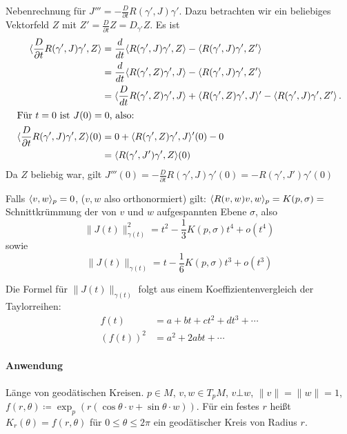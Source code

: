 \documentclass[a4paper,twoside,DIV15,BCOR12mm]{scrbook}
\renewcommand{\da}{\coloneqq}
\begin{document}
\begin{beispiel}
\begin{beweis}
\begin{enumerate}
Nebenrechnung für $J'''= -\frac D {\partial t} R(\gamma',J)\gamma'$. Dazu betrachten wir ein beliebiges Vektorfeld $Z$ mit $Z' = \frac D{\partial t}Z = D_{\gamma'}Z$. Es ist 
\begin{align*}
\langle\frac D{\partial t} R(\gamma',J) \gamma',Z\rangle &= \frac d{dt} \langle R(\gamma',J)\gamma',Z\rangle - \langle R(\gamma',J)\gamma',Z'\rangle\\
&= \frac d{dt} \langle R(\gamma',Z)\gamma',J\rangle - \langle R(\gamma',J)\gamma',Z'\rangle\\
&= \langle\frac D{dt} R(\gamma',Z)\gamma',J\rangle + \langle R(\gamma',Z)\gamma',J\rangle' - \langle R(\gamma',J)\gamma',Z'\rangle\,.\\
\intertext{Für $t=0$ ist $J(0)=0$, also:}
\langle\frac D{\partial t} R(\gamma',J) \gamma',Z\rangle(0) &= 0 + \langle R(\gamma',Z)\gamma',J\rangle'(0) - 0 \\
&= \langle R(\gamma',J')\gamma',Z\rangle(0)
\end{align*}
Da $Z$ beliebig war, gilt $J'''(0) = - \frac D{\partial t} R(\gamma',J) \gamma'(0) = - R(\gamma',J')\gamma'(0)$

\end{enumerate}
\end{beweis}

\begin{korrolar}
Falls $\langle v,w\rangle_p =0$, ($v,w$ also orthonormiert) gilt: $\langle R(v,w)v,w\rangle_p = K(p,\sigma) =$ Schnittkrümmung der von $v$ und $w$ aufgespannten Ebene $\sigma$, also
\[
\|J(t)\|_{\gamma(t)}^2 =t^2 - \frac 1 3 K(p,\sigma)t^4 + o(t^4)
\]
sowie
\[
\|J(t)\|_{\gamma(t)} = t - \frac 1 6 K(p,\sigma)t^3 + o(t^3)
\]

\end{korrolar}

\begin{beweis}
Die Formel für $\|J(t)\|_{\gamma(t)}$ folgt aus einem Koeffizientenvergleich der Taylorreihen:
\begin{align*}
f(t) &= a + bt + ct^2 + dt^3+\cdots \\
(f(t))^2 &= a^2 + 2abt + \cdots
\end{align*}
\end{beweis}

\paragraph{Anwendung} Länge von geodätischen Kreisen. $p\in M$, $v,w\in T_pM$, $v\bot w$, $\|v\|=\|w\|=1$, $f(r,\theta) \da \exp_p(r (\cos \theta \cdot v + \sin \theta \cdot w))$. Für ein festes $r$ heißt $K_r(\theta) = f(r,\theta)$ für $0\le\theta\le2\pi$ ein geodätischer Kreis von Radius $r$.


\end{beispiel}
\end{document}
